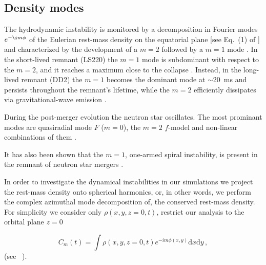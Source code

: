 \subsection{Density modes}


The hydrodynamic instability is monitored by a decomposition in Fourier modes
$e^{-\i m\phi}$ of the Eulerian rest-mass density on the equatorial plane 
[see Eq.~(1) of \citep{Radice:2016gym}] and characterized by the
development of a $m=2$ followed by a $m=1$ mode 
\citep{East:2015vix,Paschalidis:2015mla,Radice:2016gym,Lehner:2016wjg,Bernuzzi:2013rza,Kastaun:2014fna}.
In the short-lived remnant (LS220) the $m=1$ mode
is subdominant with respect to the $m=2$, and it reaches a maximum close to the collapse
\citep{Bernuzzi:2013rza}. Instead, in the long-lived remnant (DD2) the $m=1$
becomes the dominant mode at $\sim$20~ms and persists throughout the
remnant's lifetime, while the $m=2$ efficiently dissipates via
gravitational-wave emission \citep{Bernuzzi:2015opx,Radice:2016gym}.


During the post-merger evolution the neutron star oscillates. The most prominant modes are quasiradial mode $F$ ($m=0$), the $m=2$ $f$-model and non-linear combinations of them \citep[\eg][]{Shibata:2000jt,Stergioulas:2011gd}.

It has also been shown that the $m=1$, one-armed spiral instability, is present in the remnant of neutron star mergers \citep{Paschalidis:2015mla,Radice:2016gym,East:2016zvv}.

In order to investigate the dynamical instabilities in our simulations we 
project the rest-mass density onto spherical harmonics,
or, in other words, we perform the complex azimuthal mode decomposition of,
the conserved rest-mass density.
For simplicity we consider only $\rho(x,y,z=0,t)$, 
\ie restrict our analysis to the orbital plane $z=0$

\begin{equation}
\label{eq:modes}
C_m(t) = \int \rho(x,y,z=0,t) e^{-i m \phi(x,y)} \text{d}x \text{d} y \, ,
\end{equation}
(see \eg~\citet{Baiotti:2009gk}).

